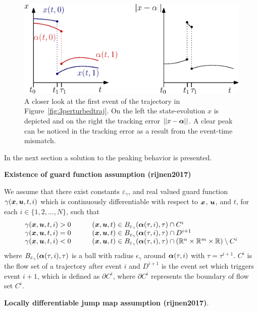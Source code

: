 \documentclass[../DC2017114Bouma.tex]{subfiles}
\begin{document}
\begin{figure}[h]
\centering
\includegraphics[width=.66\textwidth]{peakerror.eps}\caption{A closer look at the first event of the trajectory in Figure~\ref{fig:3perturbedtraj}. On the left the state-evolution $x$ is depicted and on the right the tracking error $||x-\boldsymbol{\alpha}||$. A clear peak can be noticed in the tracking error as a result from the event-time mismatch.} \label{fig:3peakerror}
\end{figure}

In the next section a solution to the peaking behavior is presented.

\textbf{Existence of guard function assumption (rijnen2017)}
\begin{myass}
We assume that there exist constants $\varepsilon_\gamma$, and real valued guard function $\gamma({\boldsymbol{x}},{\boldsymbol{u}},t,i)$ which is continuously differentiable with respect to ${\boldsymbol{x}}$, ${\boldsymbol{u}}$, and $t$, for each $i\in \{1,2,...,N\}$, such that
\begin{equation}
\begin{array}{llll}
\gamma({\boldsymbol{x}},{\boldsymbol{u}},t,i) > 0 & &	&({\boldsymbol{x}},{\boldsymbol{u}},t) \in B_{\varepsilon_\gamma}(\boldsymbol{\alpha}(\tau,i),\tau)\cap C^i\\
\gamma({\boldsymbol{x}},{\boldsymbol{u}},t,i) = 0 & &	&({\boldsymbol{x}},{\boldsymbol{u}},t) \in B_{\varepsilon_\gamma}(\boldsymbol{\alpha}(\tau,i),\tau)\cap D^{i+1}\\
\gamma({\boldsymbol{x}},{\boldsymbol{u}},t,i) < 0 & &	&({\boldsymbol{x}},{\boldsymbol{u}},t) \in B_{\varepsilon_\gamma}(\boldsymbol{\alpha}(\tau,i),\tau)\cap (\mathbb{R}^n \times \mathbb{R}^m \times \mathbb{R})\setminus C^i
\end{array}
\end{equation}
where $B_{\varepsilon_{\gamma}}(\boldsymbol{\alpha}(\tau,i),\tau)$ is a ball with radius $\epsilon_{\gamma}$ around $\boldsymbol{\alpha}(\tau,i)$ with $\tau = \tau^{i+1}$. $C^i$ is the flow set of a trajectory after event $i$ and $D^{i+1}$ is the event set which triggers event $i+1$, which is defined as $\partial C^i$, where $\partial C^i$ represents the boundary of flow set $C^i$.
\end{myass}

\textbf{Locally differentiable jump map assumption (rijnen2017)}.
\end{document}
